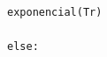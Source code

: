 \documentclass[10pt,a4paper]{article} %
\begin{document}
\begin{lstlisting}
                                                                                                                                                                                                                                                                                                                                                                                                                                                                                                                                                                                                                                                                                                                                                                                                                                                                                                                                                                                                                                                                                                                                                                                                                                                            exponencial(Tr)
                                                                                                                                                                                                                                                                                                                                                                                                                                                                                                                                                                                                                                                                                                                                                                                                                                                                                                                                                                                                                                                                                                                                                                                                                                                                        else: 

\end{lstlisting}
\end{document}
